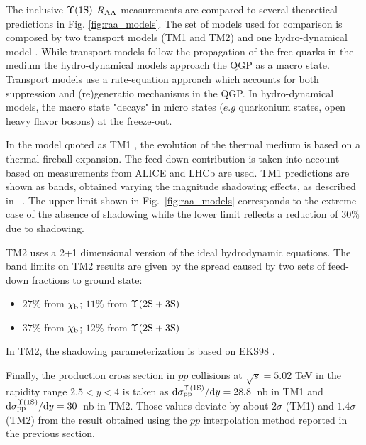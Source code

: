 The inclusive $\mbox{$\Upsilon$(1S)}$ $\mbox{$R_{\rm{AA}}$}$ measurements are compared to several theoretical predictions in Fig. \ref{fig:raa_models}.
The set of models used for comparison is composed by two transport models (TM1 and TM2)\cite{Du:2017qkv,Zhou:2014hwa} and one hydro-dynamical model \cite{Krouppa:2017jlg}.
While transport models follow the propagation of the free quarks in the medium the hydro-dynamical models approach the QGP as a macro state.
Transport models use a rate-equation approach which accounts for both suppression and (re)generatio mechanisms in the QGP.
In hydro-dynamical models, the macro state "decays" in micro states ($e.g$ quarkonium states, open heavy flavor bosons) at the freeze-out.

In the model quoted as TM1 \cite{Du:2017qkv}, the evolution of the thermal medium is based on a thermal-fireball expansion.
The feed-down contribution is taken into account based on measurements from ALICE and LHCb \cite{Abelev:2014qha,Aaij:2014caa,Aaij:2014hla} are used.
TM1 predictions are shown as bands, obtained varying the magnitude shadowing effects, as described in ~\cite{Tuchin:2010pv}. 
The upper limit shown in Fig.~\ref{fig:raa_models} corresponds to the extreme case of the absence of shadowing while the lower limit reflects a reduction of $30\%$ due to shadowing.

TM2 \cite{Zhou:2014hwa} uses a 2+1 dimensional version of the ideal hydrodynamic equations.
The band limits on TM2 results are given by the spread caused by two sets of feed-down fractions to \upsis ground state:
\begin{itemize}
\item $27\%$ from $\chi_{\rm b}$; $11\%$ from $\Upsilon({\rm 2S}+{\rm 3S})$
\item $37\%$ from $\chi_{\rm b}$; $12\%$ from $\Upsilon({\rm 2S}+{\rm 3S})$
\end{itemize}
In TM2, the shadowing parameterization is based on EKS98 \cite{Eskola:1998df}.

Finally, the \upsis production cross section in $pp$ collisions at $\sqrt{s}=5.02$ \rm{TeV} in the rapidity range $2.5 < y < 4$ is taken as $\text{d}\sigma^{\rm\Upsilon({\rm 1S})}_{\rm pp}/\text{d}y=28.8$~nb in TM1 and $\text{d}\sigma^{\rm\Upsilon({\rm 1S})}_{\rm pp}/\text{d}y=30$~nb in TM2.
Those values deviate by about $2 \sigma$ (TM1) and $1.4 \sigma$ (TM2) from the result obtained using the $pp$ interpolation method reported in the previous section.

